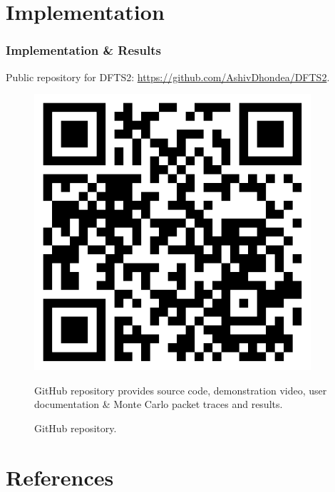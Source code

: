 \documentclass[aspectratio=169]{beamer}
\begin{document}
\section{Implementation}
	
	
\begin{frame}
\frametitle{Implementation \& Results}
Public repository for DFTS2: \url{https://github.com/AshivDhondea/DFTS2}.
    \begin{figure}
		\begin{minipage}{.4\textwidth}
		\centering
			\includegraphics[width=0.8\linewidth]{qrcode_github.pdf}
			\caption{GitHub repository.}
		\end{minipage}\hfill
		\begin{minipage}{.4\textwidth}
			GitHub repository provides source code, demonstration video, user documentation \& Monte Carlo packet traces and results.
		\end{minipage}
	\end{figure}
\end{frame}	
	
\section{References}


\end{document}
